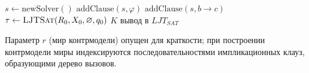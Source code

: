 \documentclass[14pt, russian]{scrartcl}
\begin{document}
\begin{listing}[!htb]
\caption{Главная процедура $LJT_{SAT}$}
\label{alg:ljtsat-main}
\begin{algorithmic}[1]
  \State $s \gets \mathrm{newSolver}()$
    \State $\mathrm{addClause}(s, \varphi)$
  \EndFor
    \State $\mathrm{addClause}(s, b \to c)$
  \EndFor
  \State $\tau \gets \Call{LJTSat}{R_0, X_0, \varnothing, q_0}$
    \State \Return $K$
  \Else
    \State \Return вывод в $LJT_{SAT}$
  \EndIf
\EndFunction
\end{algorithmic}
\end{listing}

\begin{listing}[!htb]
\caption{Рекурсивная процедура поиска вывода}
\label{alg:ljtsat}
\end{listing}

Параметр $r$ (мир контрмодели) опущен для краткости; при построении контрмодели
миры индексируются последовательностями импликационных клауз, образующими дерево
вызовов.

\anonappendix
\label{app:prove}
\end{document}
